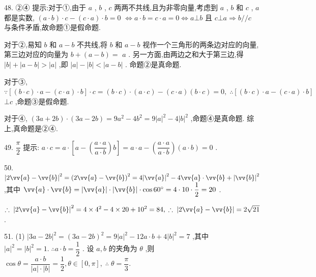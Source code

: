 48. ②④ 提示:对于①,由于 $a$ , $b$ , $c$ 两两不共线,且为非零向量,考虑到 $a$ , $b$ 和 $c$ , $a$ 都是实数, $\left( {a \cdot  b}\right)  \cdot  c - \left( {c \cdot  a}\right)  \cdot  b = 0$  $\Leftrightarrow  a \cdot  b = c \cdot  a = 0 \Leftrightarrow  a \bot  b$ 且 $c \bot  a \Rightarrow  b//c$ 与条件矛盾,故命题①是假命题.

对于②,易知 $b$ 和 $a - b$ 不共线,将 $b$ 和 $a - b$ 视作一个三角形的两条边对应的向量,第三边对应的向量为 $b + \left( {a - b}\right)  =$  $a$ . 另一方面,由两边之和大于第三边,得 $\left| b\right|  + \left| {a - b}\right|  > \left| a\right|$ ,即 $\left| a\right|  - \left| b\right|  < \left| {a - b}\right|$ . 命题②是真命题.

对于③, $\because \left\lbrack  {\left( {b \cdot  c}\right)  \cdot  a - \left( {c \cdot  a}\right)  \cdot  b}\right\rbrack   \cdot  c = \left( {b \cdot  c}\right)  \cdot  \left( {a \cdot  c}\right)  - \left( {c \cdot  a}\right) \left( {b \cdot  c}\right)  = 0,\;\therefore \left\lbrack  {\left( {b \cdot  c}\right)  \cdot  a - \left( {c \cdot  a}\right)  \cdot  b}\right\rbrack$  $\bot  c$ ,命题③是假命题.

对于④, $\left( {{3a} + {2b}}\right)  \cdot  \left( {{3a} - {2b}}\right)  = 9{a}^{2} - 4{b}^{2} = 9{\left| a\right| }^{2} - 4{\left| b\right| }^{2}$ ,命题④是真命题. 综上,真命题是②④.

49. $\dfrac{\pi }{2}$ 提示: $a \cdot  c = a \cdot  \left\lbrack  {a - \left( \dfrac{a \cdot  a}{a \cdot  b}\right) b}\right\rbrack   = a \cdot  a - \left( \dfrac{a \cdot  a}{a \cdot  b}\right) \left( {a \cdot  b}\right)  = 0$ .

50. ${\left| 2\vv{a} - \vv{b}\right| }^{2} = {\left( 2\vv{a} - \vv{b}\right) }^{2} = 4{\left| \vv{a}\right| }^{2} - 4\vv{a} \cdot  \vv{b} + {\left| \vv{b}\right| }^{2}$ ,其中 $\vv{a} \cdot  \vv{b} = \left| \vv{a}\right|  \cdot  \left| \vv{b}\right|  \cdot  \cos {60}^{ \circ  } = 4 \cdot  {10} \cdot  \dfrac{1}{2} = {20}$ .

$\therefore \;{\left| 2\vv{a} - \vv{b}\right| }^{2} = 4 \times  {4}^{2} - 4 \times  {20} + {10}^{2} = {84},\;\therefore \;\left| {2\vv{a} - \vv{b}}\right|  = 2\sqrt{21}$ .

51. (1) ${\left| 3a - 2b\right| }^{2} = {\left( 3a - 2b\right) }^{2} = 9{\left| a\right| }^{2} - {12a} \cdot  b + 4{\left| b\right| }^{2} = 7$ ,其中 ${\left| a\right| }^{2} = {\left| b\right| }^{2} = 1.\;\therefore a \cdot  b = \dfrac{1}{2}$ . 设 $a,b$ 的夹角为 $\theta$ ,则 $\cos \theta  = \dfrac{a \cdot  b}{\left| a\right|  \cdot  \left| b\right| } = \dfrac{1}{2},\theta  \in  \left\lbrack  {0,\pi }\right\rbrack  ,\;\therefore \;\theta  = \dfrac{\pi }{3}.$


